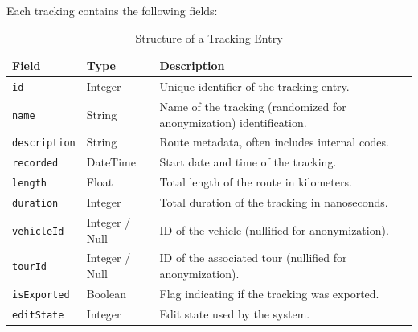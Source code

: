 \documentclass[a4paper,12pt,twoside]{scrreprt}
\begin{document}
Each tracking contains the following fields:
\begin{table}[H]
  \centering
  \caption{Structure of a Tracking Entry}
  \label{tab:tracking_structure}
  \begin{tabular}{|l|l|p{8cm}|}
    \hline
    \textbf{Field}       & \textbf{Type}  & \textbf{Description}
    \\
    \hline
    \texttt{id}          & Integer        & Unique identifier of the tracking
    entry.

    \\
    \hline
    \texttt{name}        & String         & Name of the tracking (randomized
    for anonymization)
    identification.
    \\
    \hline
    \texttt{description} & String         & Route metadata, often includes
    internal codes.
    \\
    \hline
    \texttt{recorded}    & DateTime       & Start date and time of the
    tracking.
    \\
    \hline
    \texttt{length}      & Float          & Total length of the route in
    kilometers.
    \\
    \hline
    \texttt{duration}    & Integer        & Total duration of the tracking in
    nanoseconds.
    \\
    \hline
    \texttt{vehicleId}   & Integer / Null & ID of the vehicle (nullified for
    anonymization).
    \\
    \hline
    \texttt{tourId}      & Integer / Null & ID of the associated tour
    (nullified for anonymization).
    \\
    \hline
    \texttt{isExported}  & Boolean        & Flag indicating if the tracking was
    exported.
    \\
    \hline
    \texttt{editState}   & Integer        & Edit state used by the system.
    \\
    \hline
  \end{tabular}
\end{table}
\end{document}
